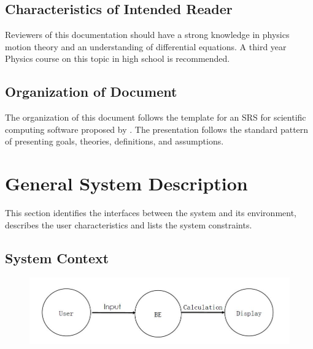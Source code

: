 \documentclass[12pt]{article}
\begin{document}
	\subsection{Characteristics of Intended Reader} 
	
	Reviewers of this documentation should have a strong knowledge in physics motion theory and an understanding of differential equations. A third year Physics course on this topic in high school is recommended.   
	
	\subsection{Organization of Document}
	
	The organization of this document follows the template for an SRS for scientific
	computing software proposed by \citet{SmithAndLai2005, SmithEtAl2007}.  The
	presentation follows the standard pattern of presenting goals, theories,
	definitions, and assumptions. 
	
	\section{General System Description}
	
	This section identifies the interfaces between the system and its environment,
	describes the user characteristics and lists the system constraints.
	
	\subsection{System Context}
	
	\begin{figure}
		\centering
		\includegraphics[width=0.7\linewidth]{./f18}
		\caption{}
		\label{fig:f18}
	\end{figure}
	
\end{document}
